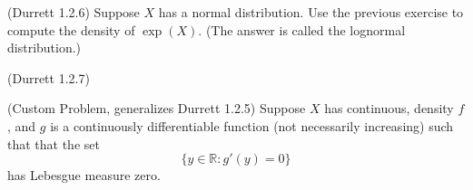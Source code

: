 \documentclass[12pt]{gradescopeexam}
\newcommand\R{\mathbb{R}}
\begin{document}
\begin{questions}
\begin{question}
  \end{question}

  \begin{question}
    (Durrett 1.2.6) Suppose $X$ has a normal distribution. Use the
    previous exercise to compute the density of $\exp(X)$. (The answer
    is called the lognormal distribution.)
    \begin{prooforbox}[7.5in]

    \end{prooforbox}
  \end{question}
  \begin{question}
    (Durrett 1.2.7)
  \end{question}

  \begin{question} (Custom Problem, generalizes Durrett 1.2.5) Suppose
    $X$ has continuous, density $f$ , and $g$ is a continuously
    differentiable function (not necessarily increasing) such that
    that the set $$\{y\in\R: g'(y) = 0\}$$ has Lebesgue measure
    zero.


\end{question}
\end{questions}
\end{document}
